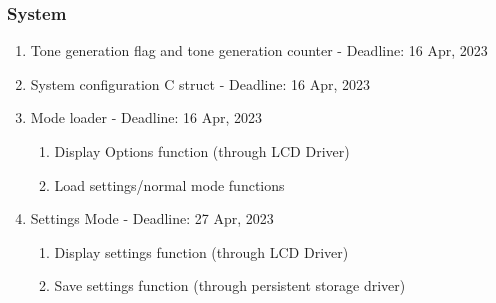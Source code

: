 \documentclass[11pt,a4paper
]{scrartcl}
\begin{document}
\subsubsection{System}
\begin{enumerate}
    \item Tone generation flag and tone generation counter - Deadline: 16 Apr, 2023
    \item System configuration C struct - Deadline:  16 Apr, 2023
    \item Mode loader - Deadline: 16 Apr, 2023
    \begin{enumerate}
        \item Display Options function (through LCD Driver)
        \item Load settings/normal mode functions
    \end{enumerate}
    \item Settings Mode - Deadline: 27 Apr, 2023
    \begin{enumerate}
        \item Display settings function (through LCD Driver)
        \item Save settings function (through persistent storage driver)
    \end{enumerate}
\end{enumerate}
\end{document}
